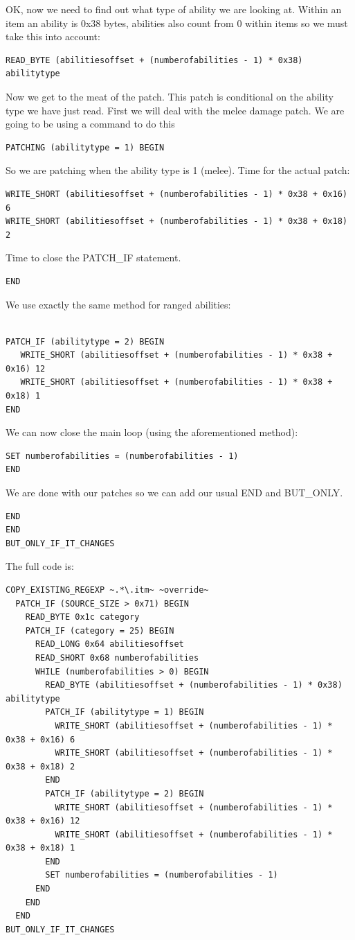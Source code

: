 \documentclass{article}
\def\ttref#1{\ahrefloc{#1}{\tt #1}}
\begin{document}
OK, now we need to find out what type of ability we are looking at. Within
an item an ability is 0x38 bytes, abilities also count from 0 within items
so we must take this into account:
\begin{verbatim}
READ_BYTE (abilitiesoffset + (numberofabilities - 1) * 0x38) abilitytype
\end{verbatim}
Now we get to the meat of the patch. This patch is conditional on the
ability type we have just read. First we will deal with the melee damage
patch. We are going to be using a \ttref{PATCH_IF} command to do this

\begin{verbatim}
PATCHING (abilitytype = 1) BEGIN
\end{verbatim}
So we are patching when the ability type is 1 (melee). Time for the actual patch:
\begin{verbatim}
WRITE_SHORT (abilitiesoffset + (numberofabilities - 1) * 0x38 + 0x16) 6
WRITE_SHORT (abilitiesoffset + (numberofabilities - 1) * 0x38 + 0x18) 2
\end{verbatim}
Time to close the PATCH_IF statement.
\begin{verbatim}
END
\end{verbatim}
We use exactly the same method for ranged abilities:
\begin{verbatim}

PATCH_IF (abilitytype = 2) BEGIN
   WRITE_SHORT (abilitiesoffset + (numberofabilities - 1) * 0x38 + 0x16) 12
   WRITE_SHORT (abilitiesoffset + (numberofabilities - 1) * 0x38 + 0x18) 1
END
\end{verbatim}
We can now close the main loop (using the aforementioned method):
\begin{verbatim}
SET numberofabilities = (numberofabilities - 1)
END
\end{verbatim}
We are done with our patches so we can add our usual END and BUT_ONLY.
\begin{verbatim}
END
END
BUT_ONLY_IF_IT_CHANGES
\end{verbatim}
The full code is:
\begin{verbatim}
COPY_EXISTING_REGEXP ~.*\.itm~ ~override~
  PATCH_IF (SOURCE_SIZE > 0x71) BEGIN
    READ_BYTE 0x1c category
    PATCH_IF (category = 25) BEGIN
      READ_LONG 0x64 abilitiesoffset
      READ_SHORT 0x68 numberofabilities
      WHILE (numberofabilities > 0) BEGIN
        READ_BYTE (abilitiesoffset + (numberofabilities - 1) * 0x38) abilitytype
        PATCH_IF (abilitytype = 1) BEGIN
          WRITE_SHORT (abilitiesoffset + (numberofabilities - 1) * 0x38 + 0x16) 6
          WRITE_SHORT (abilitiesoffset + (numberofabilities - 1) * 0x38 + 0x18) 2
        END
        PATCH_IF (abilitytype = 2) BEGIN
          WRITE_SHORT (abilitiesoffset + (numberofabilities - 1) * 0x38 + 0x16) 12
          WRITE_SHORT (abilitiesoffset + (numberofabilities - 1) * 0x38 + 0x18) 1
        END
        SET numberofabilities = (numberofabilities - 1)
      END
    END
  END
BUT_ONLY_IF_IT_CHANGES
\end{verbatim}
\end{document}

